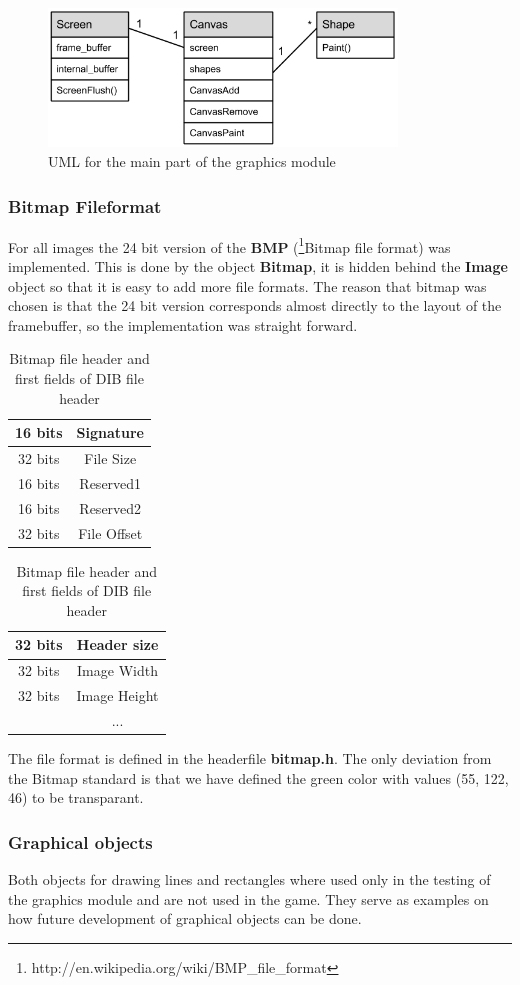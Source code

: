 \begin{figure}[h]
  \includegraphics[width=350px]{graphics/graphics_UML.png}
  \caption{UML for the main part of the graphics module}
\end{figure}

\subsubsection{Bitmap Fileformat}
For all images the 24 bit version of the {\bf BMP}
(\footnote{http://en.wikipedia.org/wiki/BMP\_file\_format}{Bitmap file format}) was implemented.
This is done by the object {\bf Bitmap}, it is hidden behind the {\bf Image} object so that it is
easy to add more file formats. The reason that bitmap was chosen is that the 24 bit version
corresponds almost directly to the layout of the framebuffer, so the implementation was straight
forward.

\begin{table}[h]
  \centering
  \begin{tabular}{|c|c|}
    \hline
    16 bits&Signature \\
    \hline
    32 bits&File Size \\
    \hline
    16 bits&Reserved1 \\
    \hline
    16 bits&Reserved2 \\
    \hline
    32 bits&File Offset \\
    \hline
  \end{tabular}
  \qquad
  \begin{tabular}{|c|c|}
    \hline
    32 bits&Header size \\
    \hline
    32 bits&Image Width \\
    \hline
    32 bits&Image Height \\
    \hline
    & ...  \\
    \hline
  \end{tabular}
  \caption{Bitmap file header and first fields of DIB file header}
\end{table}
The file format is defined in the headerfile {\bf bitmap.h}. The only deviation from the Bitmap
standard is that we have defined the green color with values (55, 122, 46) to be transparant.

\subsubsection{Graphical objects}
Both objects for drawing lines and rectangles where used only in the testing of the graphics module
and are not used in the game. They serve as examples on how future development of graphical
objects can be done.
